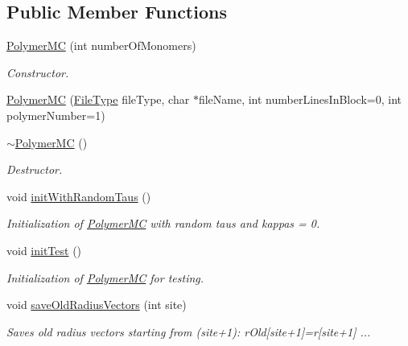 \subsection*{Public Member Functions}
\begin{DoxyCompactItemize}
\item 
\hyperlink{class_p_c_a_1_1_polymer_m_c_a0d90616fbc7d2eaaeedbdce0bc9057f0}{Polymer\+MC} (int number\+Of\+Monomers)
\begin{DoxyCompactList}\small\item\em Constructor. \end{DoxyCompactList}\item 
\hyperlink{class_p_c_a_1_1_polymer_m_c_a4617bc87ec890ae0817f2a1f20644611}{Polymer\+MC} (\hyperlink{class_p_c_a_1_1_polymer_a1df36a764fbf04ccd5cbe8edb49d43bd}{File\+Type} file\+Type, char $\ast$file\+Name, int number\+Lines\+In\+Block=0, int polymer\+Number=1)
\item 
\hyperlink{class_p_c_a_1_1_polymer_m_c_a6ed770992221cd0a7a9e364d4d5fcda3}{$\sim$\+Polymer\+MC} ()
\begin{DoxyCompactList}\small\item\em Destructor. \end{DoxyCompactList}\item 
void \hyperlink{class_p_c_a_1_1_polymer_m_c_ab075a6b6e2053461e15770d8db4f8917}{init\+With\+Random\+Taus} ()
\begin{DoxyCompactList}\small\item\em Initialization of \hyperlink{class_p_c_a_1_1_polymer_m_c}{Polymer\+MC} with random taus and kappas = 0. \end{DoxyCompactList}\item 
void \hyperlink{class_p_c_a_1_1_polymer_m_c_a327234bb757279e61f1b47ba493aaaa2}{init\+Test} ()
\begin{DoxyCompactList}\small\item\em Initialization of \hyperlink{class_p_c_a_1_1_polymer_m_c}{Polymer\+MC} for testing. \end{DoxyCompactList}\item 
void \hyperlink{class_p_c_a_1_1_polymer_m_c_a6e0c4626aff4270d9a1ece7fc51f3c0f}{save\+Old\+Radius\+Vectors} (int site)
\begin{DoxyCompactList}\small\item\em Saves old radius vectors starting from (site+1)\+: r\+Old\mbox{[}site+1\mbox{]}=r\mbox{[}site+1\mbox{]} ... \end{DoxyCompactList}\item 

\end{DoxyCompactItemize}
